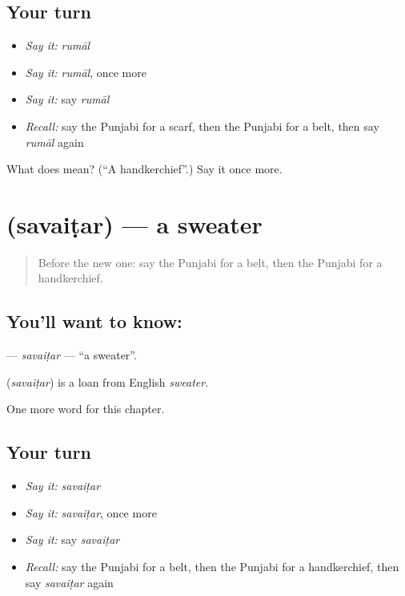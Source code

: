 \subsection*{Your turn}
\begin{itemize}
\raggedright
  \item \emph{Say it:} \emph{rumāl}
  \item \emph{Say it:} \emph{rumāl}, once more
  \item \emph{Say it:} say \emph{rumāl}
  \item \emph{Recall:} say the Punjabi for a scarf, then the Punjabi for a belt, then say \emph{rumāl} again
\end{itemize}

\begin{tcolorbox}[breakable,colback=teal!4,colframe=teal!35!black,title={Before you move on}]
What does  mean? (\textquotedblleft{}A handkerchief\textquotedblright{}.) Say it once more.
\end{tcolorbox}
\section[\texorpdfstring{\pa{ਸਵੈਟਰ} (savaiṭar)}{ਸਵੈਟਰ (savaiṭar)}]{ (savaiṭar) — a sweater}

\label{lesson:PA-C120-savaitar}



\begin{quote}
Before the new one: say the Punjabi for a belt, then the Punjabi for a handkerchief.
\end{quote}

\subsection*{You'll want to know: }
\textbf{} — \emph{savaiṭar} — \textquotedblleft{}a sweater\textquotedblright{}.

\begin{cousinweb}
\textbf{} (\emph{savaiṭar}) is a loan from English \emph{sweater}.
\end{cousinweb}

\begin{grammarlens}[title={What you've built}]
One more word for this chapter.
\end{grammarlens}

\subsection*{Your turn}
\begin{itemize}
\raggedright
  \item \emph{Say it:} \emph{savaiṭar}
  \item \emph{Say it:} \emph{savaiṭar}, once more
  \item \emph{Say it:} say \emph{savaiṭar}
  \item \emph{Recall:} say the Punjabi for a belt, then the Punjabi for a handkerchief, then say \emph{savaiṭar} again
\end{itemize}

